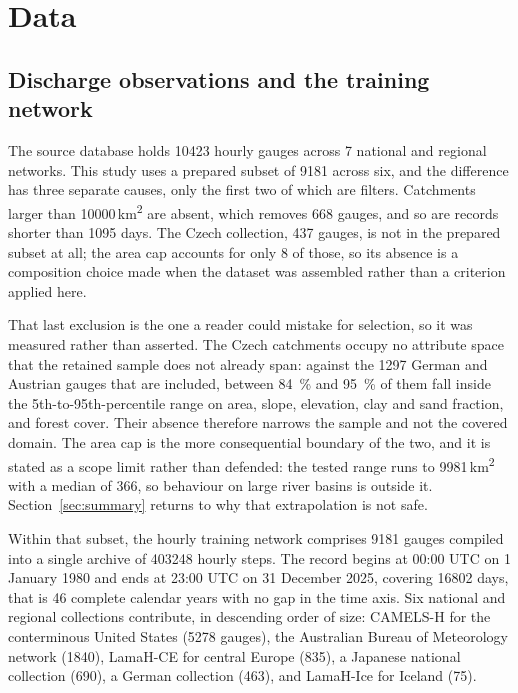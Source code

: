 \section{Data}\label{sec:data}

\subsection{Discharge observations and the training network}

The source database holds \num{10423} hourly gauges across 7 national and regional networks. This study uses a prepared subset of \num{9181} across six, and the difference has three separate causes, only the first two of which are filters. Catchments larger than \num{10000}\,\si{\km\squared} are absent, which removes \num{668} gauges, and so are records shorter than \num{1095} days. The Czech collection, \num{437} gauges, is not in the prepared subset at all; the area cap accounts for only \num{8} of those, so its absence is a composition choice made when the dataset was assembled rather than a criterion applied here.

That last exclusion is the one a reader could mistake for selection, so it was measured rather than asserted. The Czech catchments occupy no attribute space that the retained sample does not already span: against the \num{1297} German and Austrian gauges that are included, between \SI{84}{\percent} and \SI{95}{\percent} of them fall inside the 5th-to-95th-percentile range on area, slope, elevation, clay and sand fraction, and forest cover. Their absence therefore narrows the sample and not the covered domain. The area cap is the more consequential boundary of the two, and it is stated as a scope limit rather than defended: the tested range runs to \num{9981}\,\si{\km\squared} with a median of \num{366}, so behaviour on large river basins is outside it. Section~\ref{sec:summary} returns to why that extrapolation is not safe.

Within that subset, the hourly training network comprises \num{9181} gauges compiled into a single archive of
\num{403248} hourly steps. The record begins at 00:00 UTC on 1 January 1980 and ends at
23:00 UTC on 31 December 2025, covering \num{16802} days, that is \num{46} complete
calendar years with no gap in the time axis. Six national and regional collections contribute, in descending order of
size: CAMELS-H for the conterminous United States (\num{5278} gauges), the Australian
Bureau of Meteorology network (\num{1840}), LamaH-CE for central Europe (\num{835}), a
Japanese national collection (\num{690}), a German collection (\num{463}), and LamaH-Ice for
Iceland (\num{75}).

